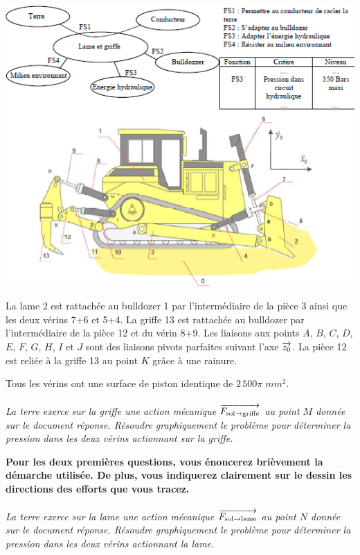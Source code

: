 \documentclass[10pt,oneside]{article}
\begin{document}
\begin{center}
\includegraphics[width=.9\textwidth]{png/img6}
\end{center}

La lame 2 est rattachée au bulldozer 1 par l'intermédiaire de la pièce 3 ainsi que les deux vérins 7+6 et 5+4. La griffe 13 est rattachée au bulldozer par l'intermédiaire de la pièce 12 et du vérin 8+9. Les liaisons aux points $A$, $B$, $C$, $D$, $E$, $F$, $G$, $H$, $I$ et $J$ sont des liaisons pivots parfaites suivant l'axe $\overrightarrow{z_0}$. La pièce 12 est reliée à la griffe 13 au point $K$ grâce à une rainure. 

Tous les vérins ont une surface de piston identique de $2\, 500\pi\; mm^2$.

\paragraph{}
\textit{La terre exerce sur la griffe une action mécanique $\overrightarrow{F_{\text{sol}\rightarrow \text{griffe}}}$ au point $M$ donnée sur le document réponse. Résoudre graphiquement le problème pour déterminer la pression dans les deux vérins actionnant sur la griffe.}

\textbf{Pour les deux premières questions, vous énoncerez brièvement la démarche utilisée. De plus, vous indiquerez clairement sur le dessin les directions des efforts que vous tracez.}

\paragraph{}
\textit{La terre exerce sur la lame une action mécanique $\overrightarrow{F_{\text{sol}\rightarrow \text{lame}}}$ au point $N$ donnée sur le document réponse. Résoudre graphiquement le problème pour déterminer la pression dans les deux vérins actionnant la lame.}
\end{document}
